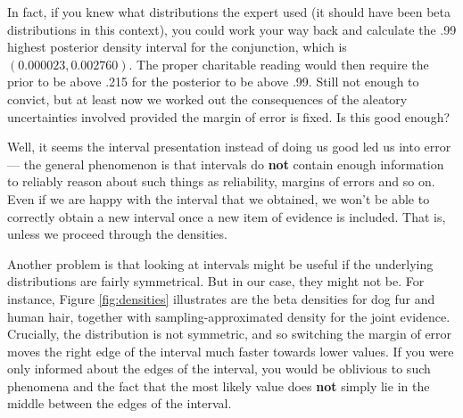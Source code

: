 \documentclass[
  10pt,
  dvipsnames,enabledeprecatedfontcommands]{scrartcl}
\begin{document}
In fact, if you knew what distributions the expert used (it should have
been beta distributions in this context), you could work your way back
and calculate the .99 highest posterior density interval for the
conjunction, which is \((0.000023, 0.002760)\). The proper charitable
reading would then require the prior to be above .215 for the posterior
to be above .99. Still not enough to convict, but at least now we worked
out the consequences of the aleatory uncertainties involved provided the
margin of error is fixed. Is this good enough?

Well, it seems the interval presentation instead of doing us good led us
into error --- the general phenomenon is that intervals do \textbf{not}
contain enough information to reliably reason about such things as
reliability, margins of errors and so on.
Even if we are happy
with the interval that we obtained, we won't be able to correctly obtain
a new interval once a new item of evidence is included. That is, unless
we proceed through the densities.

Another problem is that looking at intervals might be useful if the
underlying distributions are fairly symmetrical. But in our case, they
might not be. For instance, Figure \ref{fig:densities} illustrates are
the beta densities for dog fur and human hair, together with
sampling-approximated density for the joint evidence.
Crucially, the distribution is not symmetric, and so switching the
margin of error moves the right edge of the interval much faster towards
lower values. If you were only informed about the edges of the interval,
you would be oblivious to such phenomena and the fact that the most
likely value does \textbf{not} simply lie in the middle between the
edges of the interval.
\end{document}
